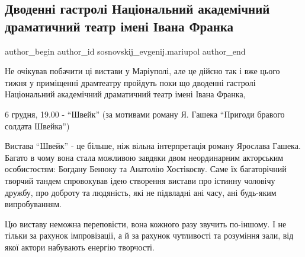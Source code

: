  
 
 
 
 

\subsection{Дводенні гастролі Національний академічний драматичний театр імені Івана Франка}
\label{sec:04_12_2018.fb.sosnovskij_evgenij.mariupol.1.gastroli_teatra_franka}

\ifcmt
 author_begin
   author_id sosnovskij_evgenij.mariupol
 author_end
\fi

Не очікував побачити ці вистави у Маріуполі, але це дійсно так і вже цього
тижня у приміщенні драмтеатру пройдуть поки що дводенні гастролі Національний
академічний драматичний театр імені Івана Франка, 

6 грудня, 19.00  -  \enquote{Швейк} (за мотивами роману Я. Гашека \enquote{Пригоди бравого
солдата Швейка})


Вистава \enquote{Швейк} - це більше, ніж вільна інтерпретація  роману Ярослава Гашека.
Багато в чому вона стала можливою завдяки двом неординарним акторським
особистостям: Богдану Бенюку та Анатолію Хостікоєву. Саме їх багаторічний
творчий тандем спровокував ідею створення вистави про істинну чоловічу дружбу,
про доброту та людяність, які не підвладні ані часу, ані будь-яким
випробуванням.


Цю виставу неможна переповісти, вона кожного разу звучить по-іншому. І не
тільки за рахунок імпровізації, а й за рахунок чутливості та розуміння зали,
від якої актори набувають енергію творчості.

